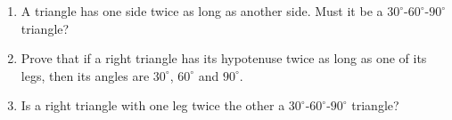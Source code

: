 \begin{enumerate}
\item[(a)] A triangle has one side twice as long as another side. Must it be a $30^\circ$-$60^\circ$-$90^\circ$ triangle?
\item[(b)] Prove that if a right triangle has its hypotenuse twice as long as one of its legs, then its angles are $30^\circ$, $60^\circ$ and $90^\circ$.
\item[(c)] Is a right triangle with one leg twice the other a $30^\circ$-$60^\circ$-$90^\circ$ triangle?
\end{enumerate}

